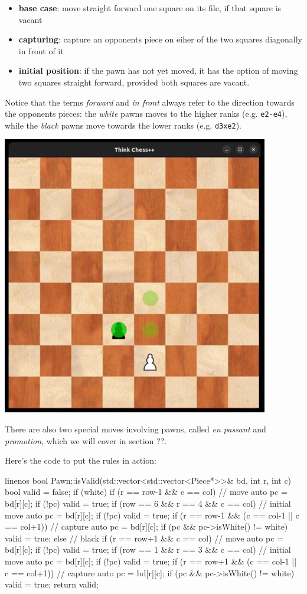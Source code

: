 \begin{itemize}
  \item \textbf{base case}: move straight forward one square on its file, if that square is vacant
  \item \textbf{capturing}: capture an opponents piece on eiher of the two squares diagonally
    in front of it
  \item \textbf{initial position}: if the pawn has not yet moved, it has the option of moving two
    squares straight forward, provided both squares are vacant.
\end{itemize}

Notice that the terms \emph{forward} and \emph{in front} always refer to the direction towards
the opponents pieces: the \emph{white} pawns moves to the higher ranks (e.g. \texttt{e2-e4}),
while the \emph{black} pawns move towards the lower ranks (e.g. \texttt{d3xe2}).

\begin{center}
\includegraphics[width=.5\linewidth]{../img/pawn.jpg}
\end{center}

There are also two special moves involving pawns, called \emph{en passant} and \emph{promotion},
which we will cover in section ??.

Here's the code to put the rules in action:

\begin{cpp*}{linenos}
bool Pawn::isValid(std::vector<std::vector<Piece*>>& bd, int r, int c) {
  bool valid = false;
  if (white) {
    if (r == row-1 && c == col) { // move
      auto pc = bd[r][c];
      if (!pc) valid = true;
    }
    if (row == 6 && r == 4 && c == col) { // initial move
      auto pc = bd[r][c];
      if (!pc) valid = true;
    }
    if (r == row-1 && (c == col-1 || c == col+1)) { // capture
      auto pc = bd[r][c];
      if (pc && pc->isWhite() != white) valid = true;
    }
  } else { // black
    if (r == row+1 && c == col) { // move
      auto pc = bd[r][c];
      if (!pc) valid = true;
    }
    if (row == 1 && r == 3 && c == col) { // initial move
      auto pc = bd[r][c];
      if (!pc) valid = true;
    }
    if (r == row+1 && (c == col-1 || c == col+1)) { // capture
      auto pc = bd[r][c];
      if (pc && pc->isWhite() != white) valid = true;
    }
  }
  return valid;
}
\end{cpp*}

